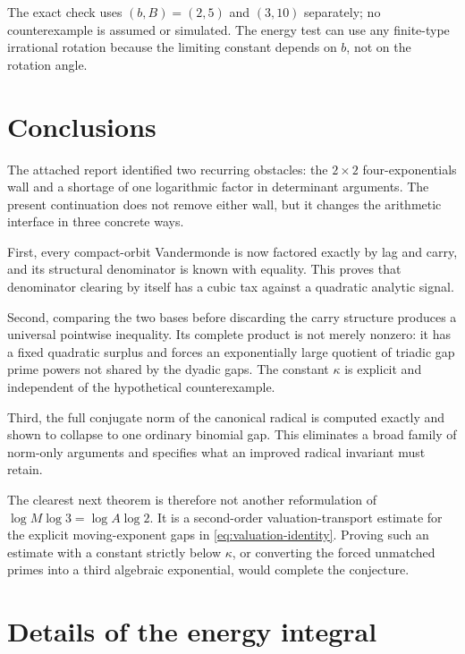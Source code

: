 \documentclass[11pt,oneside]{article}
\theoremstyle{definition}
\theoremstyle{remark}
\begin{document}
The exact check uses $(b,B)=(2,5)$ and $(3,10)$ separately; no counterexample is assumed or
simulated.  The energy test can use any finite-type irrational rotation because the limiting
constant depends on $b$, not on the rotation angle.

\section{Conclusions}
\label{sec:conclusion}

The attached report identified two recurring obstacles: the $2\times2$ four-exponentials wall
and a shortage of one logarithmic factor in determinant arguments.  The present continuation
does not remove either wall, but it changes the arithmetic interface in three concrete ways.

First, every compact-orbit Vandermonde is now factored exactly by lag and carry, and its
structural denominator is known with equality.  This proves that denominator clearing by itself
has a cubic tax against a quadratic analytic signal.

Second, comparing the two bases before discarding the carry structure produces a universal
pointwise inequality.  Its complete product is not merely nonzero: it has a fixed quadratic
surplus and forces an exponentially large quotient of triadic gap prime powers not shared by
the dyadic gaps.  The constant $\kappa$ is explicit and independent of the hypothetical
counterexample.

Third, the full conjugate norm of the canonical radical is computed exactly and shown to
collapse to one ordinary binomial gap.  This eliminates a broad family of norm-only arguments
and specifies what an improved radical invariant must retain.

The clearest next theorem is therefore not another reformulation of
$\log M\log3=\log A\log2$.  It is a second-order valuation-transport estimate for the explicit
moving-exponent gaps in \eqref{eq:valuation-identity}.  Proving such an estimate with a constant
strictly below $\kappa$, or converting the forced unmatched primes into a third algebraic
exponential, would complete the conjecture.

\appendix

\section{Details of the energy integral}
\label{app:integral}
\end{document}
